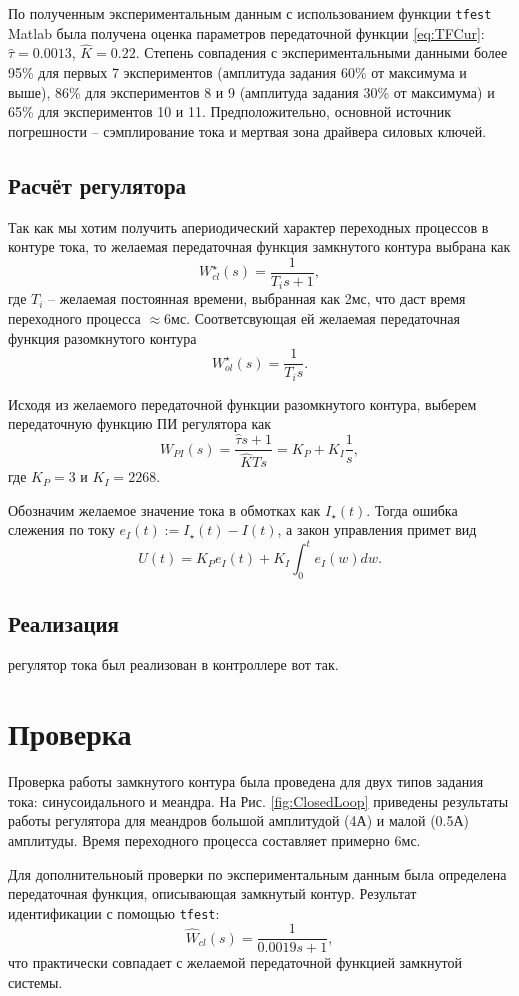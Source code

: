 \documentclass{scrartcl}
\begin{document}
По полученным экспериментальным данным с использованием функции \texttt{tfest} Matlab была получена оценка параметров передаточной функции \eqref{eq:TFCur}: $\hat{\tau}=0.0013$, $\hat{K}=0.22$. Степень совпадения с экспериментальными данными более 95\% для первых 7 экспериментов (амплитуда задания 60\% от максимума и выше), 86\% для экспериментов 8 и 9 (амплитуда задания 30\% от максимума) и 65\% для экспериментов 10 и 11. Предположительно, основной источник погрешности -- сэмплирование тока и мертвая зона драйвера силовых ключей.

\subsection{Расчёт регулятора}
Так как мы хотим получить апериодический характер переходных процессов в контуре тока, то желаемая передаточная функция замкнутого контура выбрана как
\[
    W_{cl}^\star(s) = \frac{1}{T_i s+1},
\]
где $T_i$ -- желаемая постоянная времени, выбранная как 2мс, что даст время переходного процесса $\approx 6$мс. Соответсвующая ей желаемая передаточная функция разомкнутого контура  
\[
    W_{ol}^\star(s) = \frac{1}{T_i s}.
\]

Исходя из желаемого передаточной функции разомкнутого контура, выберем передаточную функцию ПИ регулятора как
\[
    W_{PI}(s) = \frac{\hat{\tau}s+1}{\hat{K}Ts} = K_{P} + K_{I}\frac{1}{s},
\]
где $K_{P}=3$ и $K_{I}=2268$. 

Обозначим желаемое значение тока в обмотках как $I_\star(t)$. Тогда ошибка слежения по току $e_{I}(t):=I_\star(t) - I(t)$, а закон управления примет вид
\[
    U(t) = K_{P}e_{I}(t) + K_{I} \int_0^t{e_{I}(w)dw}.
\]

\subsection{Реализация}
регулятор тока был реализован в контроллере вот так.

\section{Проверка}
Проверка работы замкнутого контура была проведена для двух типов задания тока: синусоидального и меандра. На Рис. \ref{fig:ClosedLoop} приведены результаты работы регулятора для меандров большой амплитудой (4А) и малой (0.5А) амплитуды. Время переходного процесса составляет примерно 6мс.

Для дополнительноый проверки по экспериментальным данным была определена передаточная функция, описывающая замкнутый контур. Результат идентификации с помощью \texttt{tfest}:
\[
    \hat{W}_{cl}(s) = \frac{1}{0.0019s+1},
\]
что практически совпадает с желаемой передаточной функцией замкнутой системы. 
\end{document}
